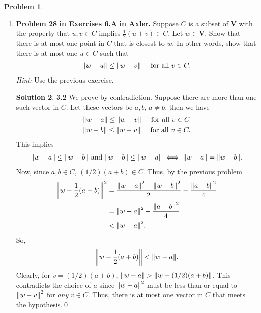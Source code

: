\documentclass{article}
\theoremstyle{definition}
\newtheorem*{prob*}{Problem}
\newtheorem*{sln*}{Solution}
\newcommand{\V}{\mathbf{V}}
\begin{document}
\begin{prob*}
\begin{enumerate}
\begin{sln*}
		\end{sln*}
		
		
		
		\newpage
		
		
		
		\item \textbf{Problem 28 in Exercises 6.A in Axler.} Suppose $C$ is a subset of $\V$ with the property that $u,v \in C$ implies $\frac{1}{2}(u+v) \in C$. Let $w\in \V$. Show that there is at most one point in $C$ that is closest to $w$. In other words, show that there is at most one $u \in C$ such that
		\begin{align*}
		\norm{w-u} \leq \norm{w-v} \hspace{0.5cm} \text{for all } v\in C.
		\end{align*}
		\textit{Hint:} Use the previous exercise. 
		
		\begin{sln*}\textbf{3.2} 
			We prove by contradiction. Suppose there are more than one such vector in $C$. Let these vectors be $a,b$, $a\neq b$, then we have
			\begin{align*}
			&\norm{w-a} \leq \norm{w-v} \hspace{0.5cm} \text{for all } v\in C\\
			&\norm{w-b} \leq \norm{w-v} \hspace{0.5cm} \text{for all } v\in C.
			\end{align*}   
			This implies
			\begin{align*}
			\norm{w-a} \leq \norm{w-b} \text{ and } \norm{w-b} \leq \norm{w-a} \iff \norm{w-a} = \norm{w-b}.
			\end{align*}
			Now, since $a,b\in C$, $(1/2)(a+b) \in C$. Thus, by the previous problem
			\begin{align*}
			\norm{w - \frac{1}{2}(a+b)}^2 &= \frac{\norm{w-a}^2 + \norm{w-b}^2}{2} - \frac{\norm{a-b}^2}{4}\\ 
			&= \norm{w-a}^2 - \frac{\norm{a-b}^2}{4} \\
			&< \norm{w-a}^2.
			\end{align*}
			So,
			\begin{align*}
			\norm{w - \frac{1}{2}(a+b)} < \norm{w-a}.
			\end{align*}
			Clearly, for $v = (1/2)(a+b)$, $\norm{w-a} > \norm{w - (1/2)(a+b)}$. This contradicts the choice of $a$ since $\norm{w-a}^2$ must be less than or equal to $\norm{w-v}^2$ for \textit{any} $v\in C$. Thus, there is at most one vector in $C$ that meets the hypothesis.\qed
		\end{sln*}
		
		
	\end{enumerate}
	
\end{prob*}
\end{document}
